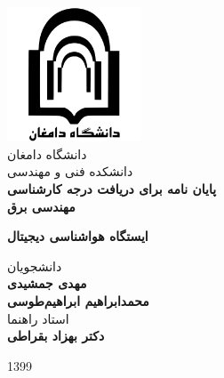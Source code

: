 \begin{center}
	\includegraphics[width=0.3\textwidth]{Assets/logo.pdf}\\
	\smallskip \LARGE
		{دانشگاه دامغان}\\
		{دانشکده فنی و مهندسی}\\
		
	\vspace{1cm} \LARGE
	\textbf{پایان نامه برای دریافت درجه کارشناسی\\مهندسی برق}\\
	
	\vspace{1cm}
	
	\huge
	\textbf{ایستگاه هواشناسی دیجیتال}
	
	\LARGE
	\vspace{3cm}
		{دانشجویان}\\
	\vspace{0.25cm}
	\textbf{مهدی جمشیدی\\محمدابراهیم ابراهیم‌طوسی}\\
	
	\vspace{1.2cm}
		{استاد راهنما}\\
	\vspace{0.25cm}
	\textbf{دکتر بهزاد بقراطی}
	
	\vfill
	{1399}
\end{center}
